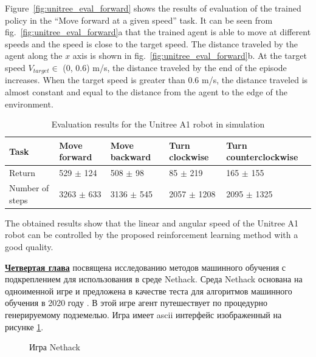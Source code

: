 Figure~\ref{fig:unitree_eval_forward} shows the results of evaluation of the trained policy in the ``Move forward at a given speed'' task. It can be seen from fig.~\ref{fig:unitree_eval_forward}a that the trained agent is able to move at different speeds and the speed is close to the target speed. The distance traveled by the agent along the $x$ axis is shown in fig.~\ref{fig:unitree_eval_forward}b. At the target speed $V_{target} \in$ (0, 0.6) m/s, the distance traveled by the end of the episode increases. When the target speed is greater than 0.6 m/s, the distance traveled is almost constant and equal to the distance from the agent to the edge of the environment.

\begin{table} [htbp]
    \centering
    \begin{threeparttable}
        \caption{Evaluation results for the Unitree A1 robot in simulation}\label{tab:unitree_eval}
        \begin{tabular}{| p{2cm} || p{2cm} | p{2cm} | p{2cm} |p{2.5cm} |}
            \hline
            \hline
            Task & Move forward & Move backward & Turn clockwise & Turn counterclockwise \\
            \hline
            Return &	529 $\pm$ 124 &	508 $\pm$ 98 &	85 $\pm$ 219 &	165 $\pm$ 155 \\
            Number of steps & 3263 $\pm$ 633 &	3136 $\pm$ 545 &	2057 $\pm$ 1208 &	2095 $\pm$ 1325 \\
            \hline
            \hline
        \end{tabular}
    \end{threeparttable}
\end{table}

The obtained results show that the linear and angular speed of the Unitree A1 robot can be controlled by the proposed reinforcement learning method with a good quality.

\underline{\textbf{Четвертая глава}} посвящена исследованию методов машинного обучения с подкреплением для использования в среде Nethack. Среда Nethack основана на одноименной игре и предложена в качестве теста для алгоритмов машинного обучения в 2020 году \cite{nethack}. В этой игре агент путешествует по процедурно генерируемому подземелью. Игра имеет ascii интерфейс изображенный на рисунке \ref{fig:nethack}.

\begin{figure}[ht]
    \caption{Игра Nethack}\label{fig:nethack}
\end{figure}

